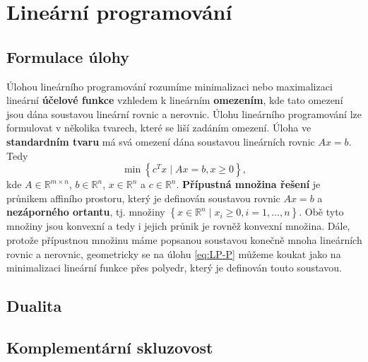 \chapter{Lineární programování}

\section{Formulace úlohy}

Úlohou lineárního programování rozumíme minimalizaci nebo maximalizaci lineární \textbf{účelové funkce} vzhledem k lineárním \textbf{omezením}, kde tato omezení jsou dána soustavou lineární rovnic a nerovnic. Úlohu lineárního programování lze formulovat v několika tvarech, které se liší zadáním omezení. Úloha ve \textbf{standardním tvaru} má svá omezení dána soustavou lineárních rovnic $Ax = b$. Tedy
\begin{equation}
    \min \left\{ c^T x \mid Ax = b, x \geq 0 \right\}, \tag{LP-P}
    \label{eq:LP-P}
\end{equation}
kde $A \in \mathbb{R}^{m \times n}$, $b \in \mathbb{R}^n$, $x \in \mathbb{R}^n$ a $c \in \mathbb{R}^n$. \textbf{Přípustná množina řešení} je průnikem affiního prostoru, který je definován soustavou rovnic $Ax = b$ a \textbf{nezáporného ortantu}, tj. množiny $\left\{ x \in \mathbb{R}^n \mid x_i \geq 0, i = 1, \dots, n \right\}$. Obě tyto množiny jsou konvexní a tedy i jejich průnik je rovněž konvexní množina. Dále, protože přípustnou množinu máme popsanou soustavou konečně mnoha lineárních rovnic a nerovnic, geometricky se na úlohu \ref{eq:LP-P} můžeme koukat jako na minimalizaci lineární funkce přes polyedr, který je definován touto soustavou. 

\section{Dualita}

\section{Komplementární skluzovost}